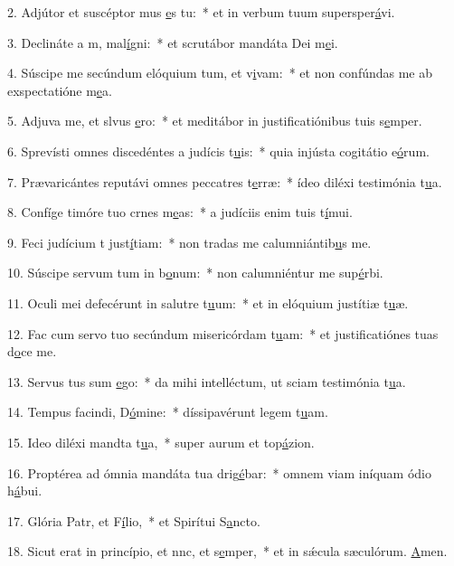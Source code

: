 2. Adjútor et suscéptor mus \uline{e}s tu:~* et in verbum tuum supersper\uline{á}vi.\par 
3. Declináte a m, mal\uline{í}gni:~* et scrutábor mandáta Dei m\uline{e}i.\par 
4. Súscipe me secúndum elóquium tum, et v\uline{i}vam:~* et non confúndas me ab exspectatióne m\uline{e}a.\par 
5. Adjuva me, et slvus \uline{e}ro:~* et meditábor in justificatiónibus tuis s\uline{e}mper.\par 
6. Sprevísti omnes discedéntes a judícis t\uline{u}is:~* quia injústa cogitátio e\uline{ó}rum.\par 
7. Prævaricántes reputávi omnes peccatres t\uline{e}rræ:~* ídeo diléxi testimónia t\uline{u}a.\par 
8. Confíge timóre tuo crnes m\uline{e}as:~* a judíciis enim tuis t\uline{í}mui.\par 
9. Feci judícium t just\uline{í}tiam:~* non tradas me calumniántib\uline{u}s me.\par 
10. Súscipe servum tum in b\uline{o}num:~* non calumniéntur me sup\uline{é}rbi.\par 
11. Oculi mei defecérunt in salutre t\uline{u}um:~* et in elóquium justítiæ t\uline{u}æ.\par 
12. Fac cum servo tuo secúndum misericórdam t\uline{u}am:~* et justificatiónes tuas d\uline{o}ce me.\par 
13. Servus tus sum \uline{e}go:~* da mihi intelléctum, ut sciam testimónia t\uline{u}a.\par 
14. Tempus facindi, D\uline{ó}mine:~* díssipavérunt legem t\uline{u}am.\par 
15. Ideo diléxi mandta t\uline{u}a,~* super aurum et top\uline{á}zion.\par 
16. Proptérea ad ómnia mandáta tua drig\uline{é}bar:~* omnem viam iníquam ódio h\uline{á}bui.\par 
17. Glória Patr, et F\uline{í}lio,~* et Spirítui S\uline{a}ncto.\par 
18. Sicut erat in princípio, et nnc, et s\uline{e}mper,~* et in sǽcula sæculórum. \uline{A}men.\par 
